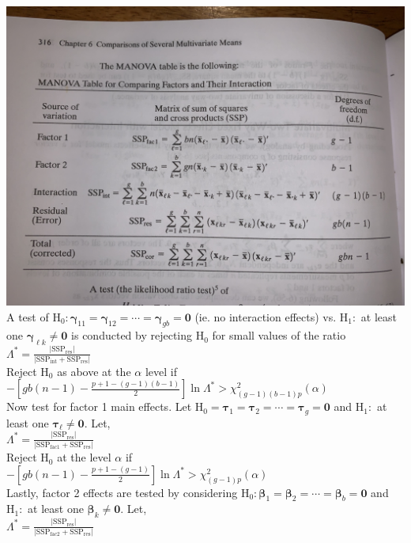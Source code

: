 \documentclass[5pt,twocolumn]{article}
\begin{document}
	\includegraphics[scale=0.07]{IMG_0493}\\
	A test of $\text{H}_0: \mathbf{\gamma}_{11} = \mathbf{\gamma}_{12} = \cdots = \mathbf{\gamma}_{gb} = \mathbf{0}$ (ie. no interaction effects) vs. $\text{H}_1:$ at least one $\mathbf{\gamma}_{\ell k} \neq \mathbf{0}$ is conducted by rejecting $\text{H}_0$ for small values of the ratio $\Lambda^* = \frac{|\text{SSP}_{\text{res}}|}{|\text{SSP}_{\text{int}} + \text{SSP}_{\text{res}}|}$\\
	\indent Reject $\text{H}_0$ as above at the $\alpha$ level if\\
	\indent $-\left[gb(n-1) - \frac{p + 1 - (g - 1)(b - 1)}{2}\right]\ln\Lambda^* > \chi^2_{(g-1)(b-1)p}(\alpha)$\\
	Now test for factor 1 main effects. Let $\text{H}_0 = \mathbf{\tau}_1 = \mathbf{\tau}_2 = \cdots = \mathbf{\tau}_g = \mathbf{0}$ and $\text{H}_1:$ at least one $\mathbf{\tau}_{\ell} \neq \mathbf{0}$. Let,\\
	\indent $\Lambda^* = \frac{|\text{SSP}_{\text{res}}|}{|\text{SSP}_{\text{fac1}} + \text{SSP}_{\text{res}}|}$\\
	\indent Reject $\text{H}_0$ at the level $\alpha$ if\\
	\indent $-\left[gb(n-1) - \frac{p + 1 - (g - 1)}{2}\right]\ln\Lambda^* > \chi^2_{(g-1)p}(\alpha)$\\
	Lastly, factor 2 effects are tested by considering $\text{H}_0: \mathbf{\beta}_1 = \mathbf{\beta}_2 = \cdots = \mathbf{\beta}_b = \mathbf{0}$ and $\text{H}_1:$ at least one $\mathbf{\beta}_k \neq \mathbf{0}$. Let,\\
	\indent $\Lambda^* = \frac{|\text{SSP}_{\text{res}}|}{|\text{SSP}_{\text{fac2}} + \text{SSP}_{\text{res}}|}$\\
\end{document}
